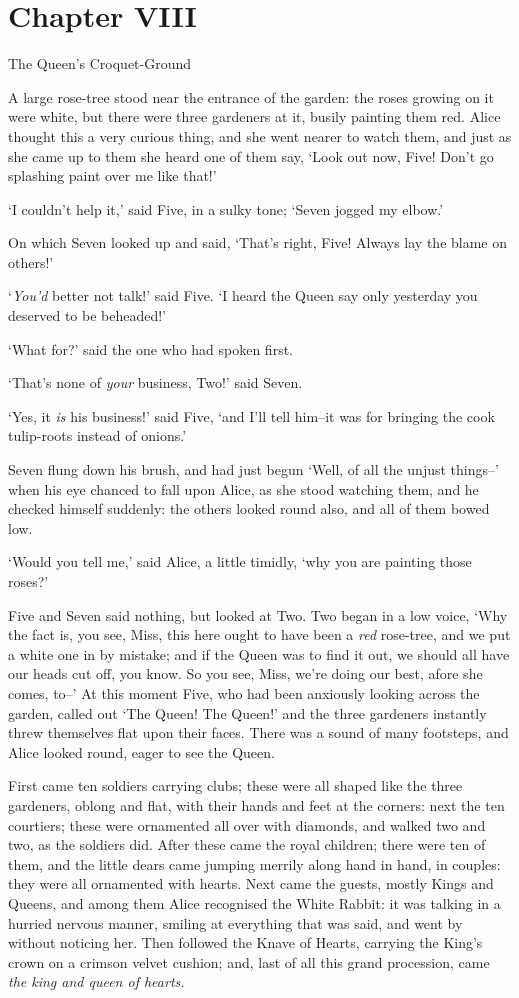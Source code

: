 \chapter{Chapter VIII}{The Queen's Croquet-Ground}


  A large rose-tree stood near the entrance of the garden:  the
roses growing on it were white, but there were three gardeners at
it, busily painting them red.  Alice thought this a very curious
thing, and she went nearer to watch them, and just as she came up
to them she heard one of them say, `Look out now, Five!  Don't go
splashing paint over me like that!'

  `I couldn't help it,' said Five, in a sulky tone; `Seven jogged
my elbow.'

  On which Seven looked up and said, `That's right, Five!  Always
lay the blame on others!'

  `{\it You'd} better not talk!' said Five.  `I heard the Queen say only
yesterday you deserved to be beheaded!'

  `What for?' said the one who had spoken first.

  `That's none of {\it your} business, Two!' said Seven.

  `Yes, it {\it is} his business!' said Five, `and I'll tell him--it
was for bringing the cook tulip-roots instead of onions.'

  Seven flung down his brush, and had just begun `Well, of all
the unjust things--' when his eye chanced to fall upon Alice, as
she stood watching them, and he checked himself suddenly:  the
others looked round also, and all of them bowed low.

  `Would you tell me,' said Alice, a little timidly, `why you are
painting those roses?'

  Five and Seven said nothing, but looked at Two.  Two began in a
low voice, `Why the fact is, you see, Miss, this here ought to
have been a {\it red} rose-tree, and we put a white one in by mistake;
and if the Queen was to find it out, we should all have our heads
cut off, you know.  So you see, Miss, we're doing our best, afore
she comes, to--'  At this moment Five, who had been anxiously
looking across the garden, called out `The Queen!  The Queen!'
and the three gardeners instantly threw themselves flat upon
their faces.  There was a sound of many footsteps, and Alice
looked round, eager to see the Queen.

  First came ten soldiers carrying clubs; these were all shaped
like the three gardeners, oblong and flat, with their hands and
feet at the corners:  next the ten courtiers; these were
ornamented all over with diamonds, and walked two and two, as the
soldiers did.  After these came the royal children; there were
ten of them, and the little dears came jumping merrily along hand
in hand, in couples:  they were all ornamented with hearts.  Next
came the guests, mostly Kings and Queens, and among them Alice
recognised the White Rabbit:  it was talking in a hurried nervous
manner, smiling at everything that was said, and went by without
noticing her.  Then followed the Knave of Hearts, carrying the
King's crown on a crimson velvet cushion; and, last of all this
grand procession, came {\it the king and queen of hearts.}

